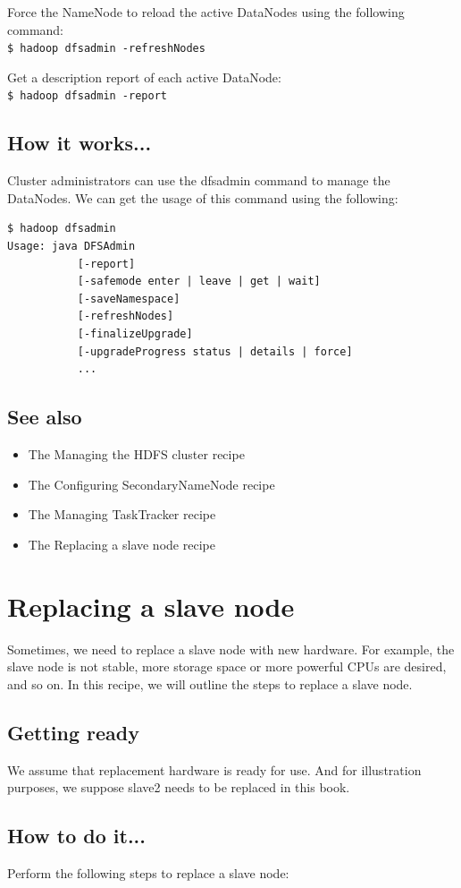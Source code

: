 Force the NameNode to reload the active DataNodes using the following command: \\
\verb|$ hadoop dfsadmin -refreshNodes|

Get a description report of each active DataNode: \\
\verb|$ hadoop dfsadmin -report|

\subsection*{How it works...}
Cluster administrators can use the dfsadmin command to manage the DataNodes. We can get the usage of this command using the following:
\begin{verbatim}
$ hadoop dfsadmin
Usage: java DFSAdmin
           [-report]
           [-safemode enter | leave | get | wait]
           [-saveNamespace]
           [-refreshNodes]
           [-finalizeUpgrade]
           [-upgradeProgress status | details | force]
           ...
\end{verbatim}
\subsection*{See also}
\begin{itemize}
  \item The Managing the HDFS cluster recipe
  \item The Configuring SecondaryNameNode recipe
  \item The Managing TaskTracker recipe
  \item The Replacing a slave node recipe
\end{itemize}

\section{Replacing a slave node}
Sometimes, we need to replace a slave node with new hardware. For example, the slave node is not stable, more storage space or more powerful CPUs are desired, and so on. In this recipe, we will outline the steps to replace a slave node.

\subsection*{Getting ready}
We assume that replacement hardware is ready for use. And for illustration purposes, we suppose slave2 needs to be replaced in this book.

\subsection*{How to do it...}
Perform the following steps to replace a slave node:

